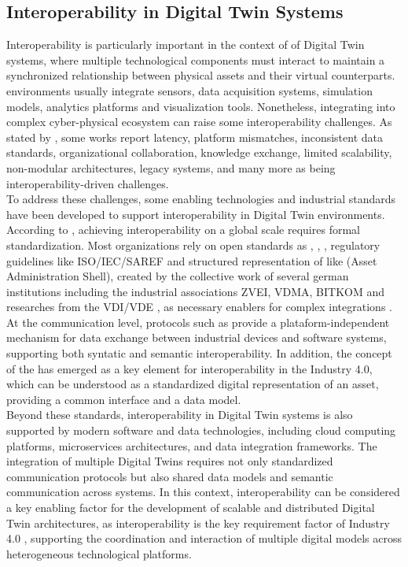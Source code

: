 \subsection{Interoperability in Digital Twin Systems}
Interoperability is particularly important in the context of of Digital Twin systems, where multiple technological components must 
interact to maintain a synchronized relationship between physical assets and their virtual counterparts. \DT environments usually 
integrate sensors, data acquisition systems, simulation models, analytics platforms and visualization tools. Nonetheless, integrating 
\DTs into complex cyber-physical ecosystem can raise some interoperability challenges. As stated by , some 
works report latency, platform mismatches, inconsistent data standards, organizational collaboration, knowledge exchange, limited 
scalability, non-modular architectures, legacy systems, and many more as being interoperability-driven challenges.\\
To address these challenges, some enabling technologies and industrial standards have been developed to support interoperability in 
Digital Twin environments. According to , achieving interoperability on a global scale requires formal 
standardization. Most organizations rely on open standards as \textit{\OPCUA}, 
\textit{\MQTT}, \REST \APIs, regulatory guidelines like ISO/IEC/SAREF and structured 
representation of \DTs like \AAS (Asset Administration Shell), created by the collective work of several german institutions including 
the industrial associations ZVEI, VDMA, BITKOM and researches from the VDI/VDE \cite{Adolphs2015}, as necessary enablers for complex 
integrations \cite{Acharya2026}. At the communication level, protocols such as \textit{\OPCUA} provide a plataform-independent 
mechanism for data exchange between industrial devices and software systems, supporting both syntatic and semantic interoperability. 
In addition, the concept of the \textit{\AAS} has emerged as a key element for interoperability in the Industry 4.0, which can be 
understood as a standardized digital representation of an asset, providing a common interface and a data model.\\
Beyond these standards, interoperability in Digital Twin systems is also supported by modern software and data technologies, 
including cloud computing platforms, microservices architectures, and data integration frameworks. The integration of multiple 
Digital Twins requires not only standardized communication protocols but also shared data models and semantic communication across 
systems. In this context, interoperability can be considered a key enabling factor for the development of scalable and distributed 
Digital Twin architectures, as interoperability is the key requirement factor of Industry 4.0 \cite{Jacoby2020}, supporting the 
coordination and interaction of multiple digital models across heterogeneous technological platforms.

